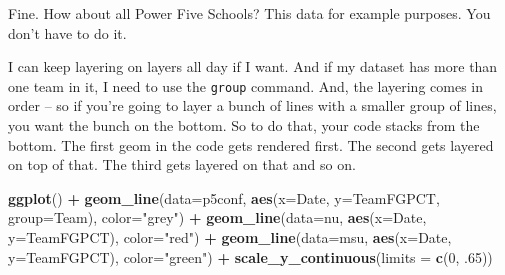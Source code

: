 \documentclass[]{book}
\newenvironment{Shaded}{\begin{snugshade}}{\end{snugshade}}
\newcommand{\DataTypeTok}[1]{\textcolor[rgb]{0.13,0.29,0.53}{#1}}
\newcommand{\DecValTok}[1]{\textcolor[rgb]{0.00,0.00,0.81}{#1}}
\newcommand{\FloatTok}[1]{\textcolor[rgb]{0.00,0.00,0.81}{#1}}
\newcommand{\KeywordTok}[1]{\textcolor[rgb]{0.13,0.29,0.53}{\textbf{#1}}}
\newcommand{\NormalTok}[1]{#1}
\newcommand{\OperatorTok}[1]{\textcolor[rgb]{0.81,0.36,0.00}{\textbf{#1}}}
\newcommand{\StringTok}[1]{\textcolor[rgb]{0.31,0.60,0.02}{#1}}
\begin{document}
Fine. How about all Power Five Schools? This data for example purposes. You don't have to do it.

\begin{Shaded}
\end{Shaded}

I can keep layering on layers all day if I want. And if my dataset has more than one team in it, I need to use the \texttt{group} command. And, the layering comes in order -- so if you're going to layer a bunch of lines with a smaller group of lines, you want the bunch on the bottom. So to do that, your code stacks from the bottom. The first geom in the code gets rendered first. The second gets layered on top of that. The third gets layered on that and so on.

\begin{Shaded}
\begin{Highlighting}[]
\KeywordTok{ggplot}\NormalTok{() }\OperatorTok{+}\StringTok{ }\KeywordTok{geom_line}\NormalTok{(}\DataTypeTok{data=}\NormalTok{p5conf, }\KeywordTok{aes}\NormalTok{(}\DataTypeTok{x=}\NormalTok{Date, }\DataTypeTok{y=}\NormalTok{TeamFGPCT, }\DataTypeTok{group=}\NormalTok{Team), }\DataTypeTok{color=}\StringTok{"grey"}\NormalTok{) }\OperatorTok{+}\StringTok{ }\KeywordTok{geom_line}\NormalTok{(}\DataTypeTok{data=}\NormalTok{nu, }\KeywordTok{aes}\NormalTok{(}\DataTypeTok{x=}\NormalTok{Date, }\DataTypeTok{y=}\NormalTok{TeamFGPCT), }\DataTypeTok{color=}\StringTok{"red"}\NormalTok{) }\OperatorTok{+}\StringTok{ }\KeywordTok{geom_line}\NormalTok{(}\DataTypeTok{data=}\NormalTok{msu, }\KeywordTok{aes}\NormalTok{(}\DataTypeTok{x=}\NormalTok{Date, }\DataTypeTok{y=}\NormalTok{TeamFGPCT), }\DataTypeTok{color=}\StringTok{"green"}\NormalTok{) }\OperatorTok{+}\StringTok{ }\KeywordTok{scale_y_continuous}\NormalTok{(}\DataTypeTok{limits =} \KeywordTok{c}\NormalTok{(}\DecValTok{0}\NormalTok{, }\FloatTok{.65}\NormalTok{))}
\end{Highlighting}
\end{Shaded}
\end{document}
